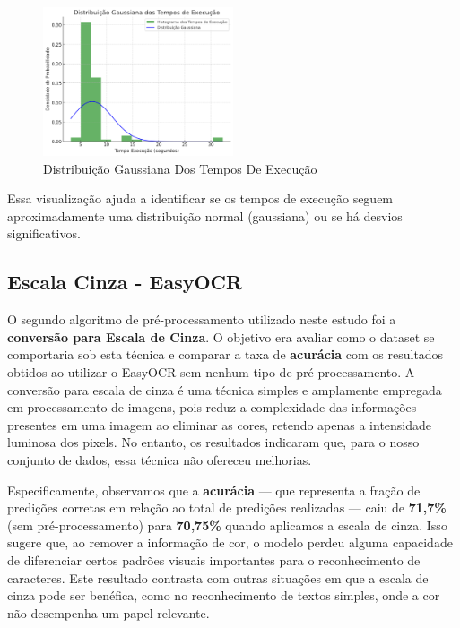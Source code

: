 \documentclass[conference]{IEEEtran}
\begin{document}
\begin{figure}[htbp]
	\centerline{\includegraphics[width=0.5\textwidth]{img6.png}}
	\caption{Distribuição Gaussiana Dos Tempos De Execução}
	\label{img6}
\end{figure}

Essa visualização ajuda a identificar se os tempos de execução seguem aproximadamente uma distribuição normal (gaussiana) ou se há desvios significativos.


\subsection{Escala Cinza - EasyOCR}

O segundo algoritmo de pré-processamento utilizado neste estudo foi a \textbf{conversão para Escala de Cinza}. O objetivo era avaliar como o dataset se comportaria sob esta técnica e comparar a taxa de \textbf{acurácia} com os resultados obtidos ao utilizar o EasyOCR sem nenhum tipo de pré-processamento. A conversão para escala de cinza é uma técnica simples e amplamente empregada em processamento de imagens, pois reduz a complexidade das informações presentes em uma imagem ao eliminar as cores, retendo apenas a intensidade luminosa dos pixels. No entanto, os resultados indicaram que, para o nosso conjunto de dados, essa técnica não ofereceu melhorias.

Especificamente, observamos que a \textbf{acurácia} — que representa a fração de predições corretas em relação ao total de predições realizadas — caiu de \textbf{71,7\%} (sem pré-processamento) para \textbf{70,75\%} quando aplicamos a escala de cinza. Isso sugere que, ao remover a informação de cor, o modelo perdeu alguma capacidade de diferenciar certos padrões visuais importantes para o reconhecimento de caracteres. Este resultado contrasta com outras situações em que a escala de cinza pode ser benéfica, como no reconhecimento de textos simples, onde a cor não desempenha um papel relevante.
\end{document}
